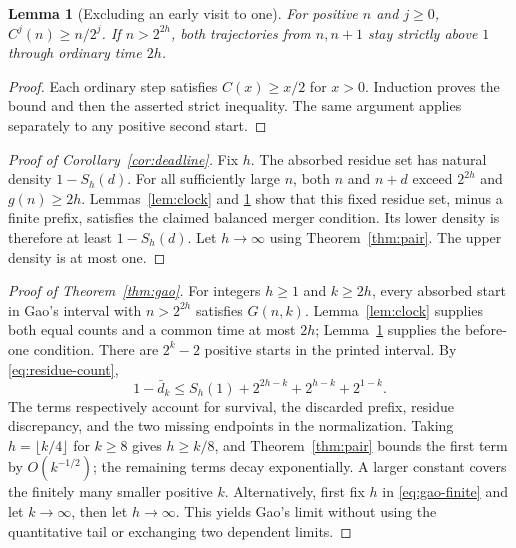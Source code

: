 \documentclass[11pt]{amsart}
\newtheorem{lemma}[theorem]{Lemma}
\theoremstyle{definition}
\theoremstyle{remark}
\begin{document}
\begin{lemma}[Excluding an early visit to one]\label{lem:before-one}
For positive $n$ and $j\ge0$, $C^j(n)\ge n/2^j$. If $n>2^{2h}$, both trajectories from $n,n+1$ stay strictly above $1$ through ordinary time $2h$.
\end{lemma}
\begin{proof}
Each ordinary step satisfies $C(x)\ge x/2$ for $x>0$. Induction proves the bound and then the asserted strict inequality. The same argument applies separately to any positive second start.
\end{proof}

\begin{proof}[Proof of Corollary~\ref{cor:deadline}]
Fix $h$. The absorbed residue set has natural density $1-S_h(d)$. For all sufficiently large $n$, both $n$ and $n+d$ exceed $2^{2h}$ and $g(n)\ge2h$. Lemmas~\ref{lem:clock} and \ref{lem:before-one} show that this fixed residue set, minus a finite prefix, satisfies the claimed balanced merger condition. Its lower density is therefore at least $1-S_h(d)$. Let $h\to\infty$ using Theorem~\ref{thm:pair}. The upper density is at most one.
\end{proof}

\begin{proof}[Proof of Theorem~\ref{thm:gao}]
For integers $h\ge1$ and $k\ge2h$, every absorbed start in Gao's interval with $n>2^{2h}$ satisfies $G(n,k)$. Lemma~\ref{lem:clock} supplies both equal counts and a common time at most $2h$; Lemma~\ref{lem:before-one} supplies the before-one condition.
There are $2^k-2$ positive starts in the printed interval. By \eqref{eq:residue-count},
\begin{equation}\label{eq:gao-finite}
 1-\bar d_k
 \le S_h(1)+2^{2h-k}+2^{h-k}+2^{1-k}.
\end{equation}
The terms respectively account for survival, the discarded prefix, residue discrepancy, and the two missing endpoints in the normalization.
Taking $h=\lfloor k/4\rfloor$ for $k\ge8$ gives $h\ge k/8$, and Theorem~\ref{thm:pair} bounds the first term by $O(k^{-1/2})$; the remaining terms decay exponentially. A larger constant covers the finitely many smaller positive $k$.
Alternatively, first fix $h$ in \eqref{eq:gao-finite} and let $k\to\infty$, then let $h\to\infty$. This yields Gao's limit without using the quantitative tail or exchanging two dependent limits.
\end{proof}
\end{document}
